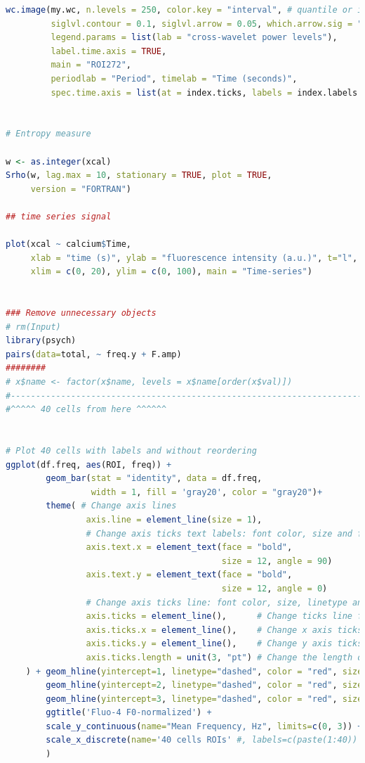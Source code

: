 \documentclass{biophys-new}
\begin{document}
\begin{lstlisting}[language=R]
wc.image(my.wc, n.levels = 250, color.key = "interval", # quantile or interval
         siglvl.contour = 0.1, siglvl.arrow = 0.05, which.arrow.sig = "wt",
         legend.params = list(lab = "cross-wavelet power levels"),
         label.time.axis = TRUE,
         main = "ROI272",
         periodlab = "Period", timelab = "Time (seconds)",
         spec.time.axis = list(at = index.ticks, labels = index.labels.rounded))


# Entropy measure

w <- as.integer(xcal)
Srho(w, lag.max = 10, stationary = TRUE, plot = TRUE,
     version = "FORTRAN")

## time series signal

plot(xcal ~ calcium$Time,
     xlab = "time (s)", ylab = "fluorescence intensity (a.u.)", t="l",
     xlim = c(0, 20), ylim = c(0, 100), main = "Time-series")


### Remove unnecessary objects
# rm(Input)
library(psych)
pairs(data=total, ~ freq.y + F.amp)
########
# x$name <- factor(x$name, levels = x$name[order(x$val)])
#---------------------------------------------------------------------------
#^^^^^ 40 cells from here ^^^^^^


# Plot 40 cells with labels and without reordering
ggplot(df.freq, aes(ROI, freq)) +
        geom_bar(stat = "identity", data = df.freq,
                 width = 1, fill = 'gray20', color = "gray20")+
        theme( # Change axis lines
                axis.line = element_line(size = 1),
                # Change axis ticks text labels: font color, size and face
                axis.text.x = element_text(face = "bold",
                                           size = 12, angle = 90)
                axis.text.y = element_text(face = "bold",
                                           size = 12, angle = 0)
                # Change axis ticks line: font color, size, linetype and length
                axis.ticks = element_line(),      # Change ticks line fo all
                axis.ticks.x = element_line(),    # Change x axis ticks only
                axis.ticks.y = element_line(),    # Change y axis ticks only
                axis.ticks.length = unit(3, "pt") # Change the length of tick
    ) + geom_hline(yintercept=1, linetype="dashed", color = "red", size = 1) +
        geom_hline(yintercept=2, linetype="dashed", color = "red", size = 1) +
        geom_hline(yintercept=3, linetype="dashed", color = "red", size = 1) +
        ggtitle('Fluo-4 F0-normalized') +
        scale_y_continuous(name="Mean Frequency, Hz", limits=c(0, 3)) +
        scale_x_discrete(name='40 cells ROIs' #, labels=c(paste(1:40))
        )

\end{lstlisting}
\end{document}
